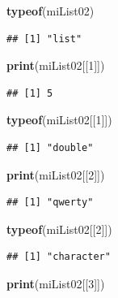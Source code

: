 \documentclass[twoside,symmetric]{book}
\newenvironment{Shaded}{}{}
\newcommand{\DecValTok}[1]{#1}
\newcommand{\KeywordTok}[1]{\textbf{#1}}
\newcommand{\NormalTok}[1]{#1}
\begin{document}
\begin{Shaded}
\begin{Highlighting}[]
\KeywordTok{typeof}\NormalTok{(miList02)}
\end{Highlighting}
\end{Shaded}

\begin{verbatim}
## [1] "list"
\end{verbatim}

\begin{Shaded}
\begin{Highlighting}[]
\KeywordTok{print}\NormalTok{(miList02[[}\DecValTok{1}\NormalTok{]])}
\end{Highlighting}
\end{Shaded}

\begin{verbatim}
## [1] 5
\end{verbatim}

\begin{Shaded}
\begin{Highlighting}[]
\KeywordTok{typeof}\NormalTok{(miList02[[}\DecValTok{1}\NormalTok{]])}
\end{Highlighting}
\end{Shaded}

\begin{verbatim}
## [1] "double"
\end{verbatim}

\begin{Shaded}
\begin{Highlighting}[]
\KeywordTok{print}\NormalTok{(miList02[[}\DecValTok{2}\NormalTok{]])}
\end{Highlighting}
\end{Shaded}

\begin{verbatim}
## [1] "qwerty"
\end{verbatim}

\begin{Shaded}
\begin{Highlighting}[]
\KeywordTok{typeof}\NormalTok{(miList02[[}\DecValTok{2}\NormalTok{]])}
\end{Highlighting}
\end{Shaded}

\begin{verbatim}
## [1] "character"
\end{verbatim}

\begin{Shaded}
\begin{Highlighting}[]
\KeywordTok{print}\NormalTok{(miList02[[}\DecValTok{3}\NormalTok{]])}
\end{Highlighting}
\end{Shaded}
\end{document}
